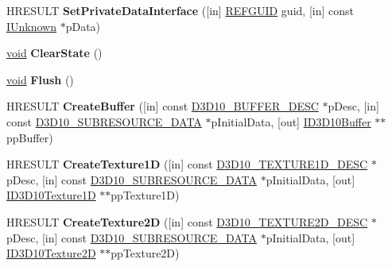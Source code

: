 \begin{DoxyCompactItemize}
\item 
\mbox{\label{interface_i_d3_d10_device_a6e701ec667fe00d869770d10f872cf77}} 
H\+R\+E\+S\+U\+LT {\bfseries Set\+Private\+Data\+Interface} (\mbox{[}in\mbox{]} \hyperlink{struct___g_u_i_d}{R\+E\+F\+G\+U\+ID} guid, \mbox{[}in\mbox{]} const \hyperlink{interface_i_unknown}{I\+Unknown} $\ast$p\+Data)
\item 
\mbox{\label{interface_i_d3_d10_device_a25dfca7b852ec7685ed3db8401cec710}} 
\hyperlink{interfacevoid}{void} {\bfseries Clear\+State} ()
\item 
\mbox{\label{interface_i_d3_d10_device_ad9f0a94fb318f454cb9e322cb34e82b1}} 
\hyperlink{interfacevoid}{void} {\bfseries Flush} ()
\item 
\mbox{\label{interface_i_d3_d10_device_acbef15f5ab894fd6effa7224c5c9b506}} 
H\+R\+E\+S\+U\+LT {\bfseries Create\+Buffer} (\mbox{[}in\mbox{]} const \hyperlink{struct_d3_d10___b_u_f_f_e_r___d_e_s_c}{D3\+D10\+\_\+\+B\+U\+F\+F\+E\+R\+\_\+\+D\+E\+SC} $\ast$p\+Desc, \mbox{[}in\mbox{]} const \hyperlink{struct_d3_d10___s_u_b_r_e_s_o_u_r_c_e___d_a_t_a}{D3\+D10\+\_\+\+S\+U\+B\+R\+E\+S\+O\+U\+R\+C\+E\+\_\+\+D\+A\+TA} $\ast$p\+Initial\+Data, \mbox{[}out\mbox{]} \hyperlink{interface_i_d3_d10_buffer}{I\+D3\+D10\+Buffer} $\ast$$\ast$pp\+Buffer)
\item 
\mbox{\label{interface_i_d3_d10_device_aa344ebd01c644cc83f4a585717b49caa}} 
H\+R\+E\+S\+U\+LT {\bfseries Create\+Texture1D} (\mbox{[}in\mbox{]} const \hyperlink{struct_d3_d10___t_e_x_t_u_r_e1_d___d_e_s_c}{D3\+D10\+\_\+\+T\+E\+X\+T\+U\+R\+E1\+D\+\_\+\+D\+E\+SC} $\ast$p\+Desc, \mbox{[}in\mbox{]} const \hyperlink{struct_d3_d10___s_u_b_r_e_s_o_u_r_c_e___d_a_t_a}{D3\+D10\+\_\+\+S\+U\+B\+R\+E\+S\+O\+U\+R\+C\+E\+\_\+\+D\+A\+TA} $\ast$p\+Initial\+Data, \mbox{[}out\mbox{]} \hyperlink{interface_i_d3_d10_texture1_d}{I\+D3\+D10\+Texture1D} $\ast$$\ast$pp\+Texture1D)
\item 
\mbox{\label{interface_i_d3_d10_device_a6e46d18738c528ff0ab8a726e53aaa51}} 
H\+R\+E\+S\+U\+LT {\bfseries Create\+Texture2D} (\mbox{[}in\mbox{]} const \hyperlink{struct_d3_d10___t_e_x_t_u_r_e2_d___d_e_s_c}{D3\+D10\+\_\+\+T\+E\+X\+T\+U\+R\+E2\+D\+\_\+\+D\+E\+SC} $\ast$p\+Desc, \mbox{[}in\mbox{]} const \hyperlink{struct_d3_d10___s_u_b_r_e_s_o_u_r_c_e___d_a_t_a}{D3\+D10\+\_\+\+S\+U\+B\+R\+E\+S\+O\+U\+R\+C\+E\+\_\+\+D\+A\+TA} $\ast$p\+Initial\+Data, \mbox{[}out\mbox{]} \hyperlink{interface_i_d3_d10_texture2_d}{I\+D3\+D10\+Texture2D} $\ast$$\ast$pp\+Texture2D)
$$
\end{DoxyCompactItemize}
